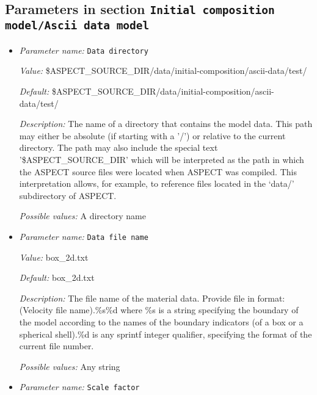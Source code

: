 \subsection{Parameters in section \tt Initial composition model/Ascii data model}
\label{parameters:Initial_20composition_20model/Ascii_20data_20model}

\begin{itemize}
\item {\it Parameter name:} {\tt Data directory}
\label{parameters:Initial composition model/Ascii data model/Data directory}


{\it Value:} \$ASPECT\_SOURCE\_DIR/data/initial-composition/ascii-data/test/


{\it Default:} \$ASPECT\_SOURCE\_DIR/data/initial-composition/ascii-data/test/


{\it Description:} The name of a directory that contains the model data. This path may either be absolute (if starting with a '/') or relative to the current directory. The path may also include the special text '\$ASPECT\_SOURCE\_DIR' which will be interpreted as the path in which the ASPECT source files were located when ASPECT was compiled. This interpretation allows, for example, to reference files located in the `data/' subdirectory of ASPECT. 


{\it Possible values:} A directory name
\item {\it Parameter name:} {\tt Data file name}
\label{parameters:Initial composition model/Ascii data model/Data file name}


{\it Value:} box\_2d.txt


{\it Default:} box\_2d.txt


{\it Description:} The file name of the material data. Provide file in format: (Velocity file name).\%s\%d where \%s is a string specifying the boundary of the model according to the names of the boundary indicators (of a box or a spherical shell).\%d is any sprintf integer qualifier, specifying the format of the current file number. 


{\it Possible values:} Any string
\item {\it Parameter name:} {\tt Scale factor}
\label{parameters:Initial composition model/Ascii data model/Scale factor}



\end{itemize}
